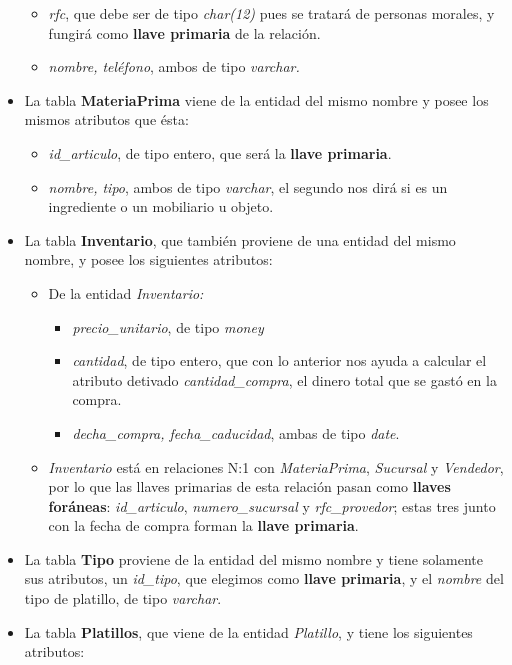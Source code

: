 \documentclass[11pt]{article}
\begin{document}
\begin{itemize}
    \begin{itemize}
    \item \textit{rfc}, que debe ser de tipo \textit{char(12)} pues se tratará de personas morales, y fungirá como \textbf{llave primaria} de la relación.
    \item \textit{nombre, teléfono}, ambos de tipo
    \textit{varchar.}
\end{itemize}
\item La tabla \textbf{MateriaPrima} viene de la entidad del mismo nombre y posee los mismos atributos que ésta:\begin{itemize}
    \item \textit{id\_articulo}, de tipo entero, que será la \textbf{llave primaria}.
    \item \textit{nombre, tipo}, ambos de tipo \textit{varchar}, el segundo nos dirá si es un ingrediente o un mobiliario u objeto.
\end{itemize}
\item La tabla \textbf{Inventario}, que también proviene de una entidad del mismo nombre, y posee los siguientes atributos:
\begin{itemize}
\item De la entidad \textit{Inventario:}
\begin{itemize}
\item \textit{precio\_unitario}, de tipo \textit{money}
\item \textit{cantidad}, de tipo entero, que con lo anterior nos ayuda a calcular el atributo detivado \textit{cantidad\_compra}, el dinero total que se gastó en la compra.
\item \textit{decha\_compra, fecha\_caducidad}, ambas de tipo \textit{date}.
\end{itemize}
\item \textit{Inventario} está en relaciones N:1 con \textit{MateriaPrima}, \textit{Sucursal} y \textit{Vendedor}, por lo que las llaves primarias de esta relación pasan como \textbf{llaves foráneas}: \textit{id\_articulo}, \textit{numero\_sucursal} y \textit{rfc\_provedor}; estas tres junto con la fecha de compra forman la \textbf{llave primaria}.
\end{itemize}
\item La tabla \textbf{Tipo} proviene de la entidad del mismo nombre y tiene solamente sus atributos, un \textit{id\_tipo}, que elegimos como \textbf{llave primaria}, y el \textit{nombre} del tipo de platillo, de tipo \textit{varchar}.
\item La tabla \textbf{Platillos}, que viene de la entidad \textit{Platillo}, y tiene los siguientes atributos:

\end{itemize}
\end{document}
